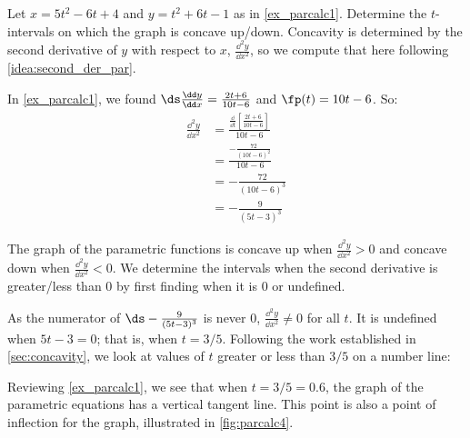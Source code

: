 \begin{example}\label{ex_parcalc4}%
Let $x=5t^2-6t+4$ and $y=t^2+6t-1$ as in \autoref{ex_parcalc1}. Determine the $t$-intervals on which the graph is concave up/down.
\solution
Concavity is determined by the second derivative of $y$ with respect to $x$, $\frac{\dd^2y}{\dd x^2}$, so we compute that here following \autoref{idea:second_der_par}.

In \autoref{ex_parcalc1}, we found $\ds\frac{\dd y}{\dd x} = \frac{2t+6}{10t-6}$ and $\fp(t) = 10t-6$. So:
\begin{align*}
	\frac{\dd^2y}{\dd x^2}
	&= \frac{\frac{\dd}{\dd t}\left[\frac{2t+6}{10t-6}\right]}{10t-6} \\
	&= \frac{-\frac{72}{(10t-6)^2}}{10t-6}\\
	&= -\frac{72}{(10t-6)^3} \\&= -\frac{9}{(5t-3)^3}
\end{align*}


The graph of the parametric functions is concave up when $\frac{\dd^2y}{\dd x^2} > 0$ and concave down when $\frac{\dd^2y}{\dd x^2} <0$. We determine the intervals when the second derivative is greater/less than 0 by first finding when it is 0 or undefined.

As the numerator of $\ds -\frac{9}{(5t-3)^3}$ is never 0, $\frac{\dd^2y}{\dd x^2} \neq 0$ for all $t$. It is undefined when $5t-3=0$; that is, when $t= 3/5$. Following the work established in \autoref{sec:concavity}, we look at values of $t$ greater or less than $3/5$ on a number line:
\begin{center}
\end{center}

Reviewing \autoref{ex_parcalc1}, we see that when $t=3/5=0.6$, the graph of the parametric equations has a vertical tangent line. This point is also a point of inflection for the graph, illustrated in \autoref{fig:parcalc4}.
\end{example}

